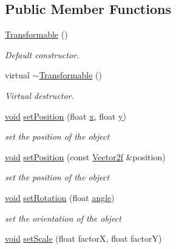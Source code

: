 \subsection*{Public Member Functions}
\begin{DoxyCompactItemize}
\item 
\hyperlink{classsf_1_1_transformable_ae71710de0fef423121bab1c684954a2e}{Transformable} ()
\begin{DoxyCompactList}\small\item\em Default constructor. \end{DoxyCompactList}\item 
virtual \hyperlink{classsf_1_1_transformable_a43253abcb863195a673c2a347a7425cc}{$\sim$\-Transformable} ()
\begin{DoxyCompactList}\small\item\em Virtual destructor. \end{DoxyCompactList}\item 
\hyperlink{glutf90_8h_ac778d6f63f1aaf8ebda0ce6ac821b56e}{void} \hyperlink{classsf_1_1_transformable_a4dbfb1a7c80688b0b4c477d706550208}{set\-Position} (float \hyperlink{gl3_8h_a92d0386e5c19fb81ea88c9f99644ab1d}{x}, float \hyperlink{gl3_8h_a66ddd433d2cacfe27f5906b7e86faeed}{y})
\begin{DoxyCompactList}\small\item\em set the position of the object \end{DoxyCompactList}\item 
\hyperlink{glutf90_8h_ac778d6f63f1aaf8ebda0ce6ac821b56e}{void} \hyperlink{classsf_1_1_transformable_af1a42209ce2b5d3f07b00f917bcd8015}{set\-Position} (const \hyperlink{namespacesf_acf03098c2577b869e2fa6836cc48f1a0}{Vector2f} \&position)
\begin{DoxyCompactList}\small\item\em set the position of the object \end{DoxyCompactList}\item 
\hyperlink{glutf90_8h_ac778d6f63f1aaf8ebda0ce6ac821b56e}{void} \hyperlink{classsf_1_1_transformable_a32baf2bf1a74699b03bf8c95030a38ed}{set\-Rotation} (float \hyperlink{_vector3_8h_abd17f37dc7bb5b2bd9a569193ebcdda4}{angle})
\begin{DoxyCompactList}\small\item\em set the orientation of the object \end{DoxyCompactList}\item 
\hyperlink{glutf90_8h_ac778d6f63f1aaf8ebda0ce6ac821b56e}{void} \hyperlink{classsf_1_1_transformable_aaec50b46b3f41b054763304d1e727471}{set\-Scale} (float factor\-X, float factor\-Y)

\end{DoxyCompactItemize}
